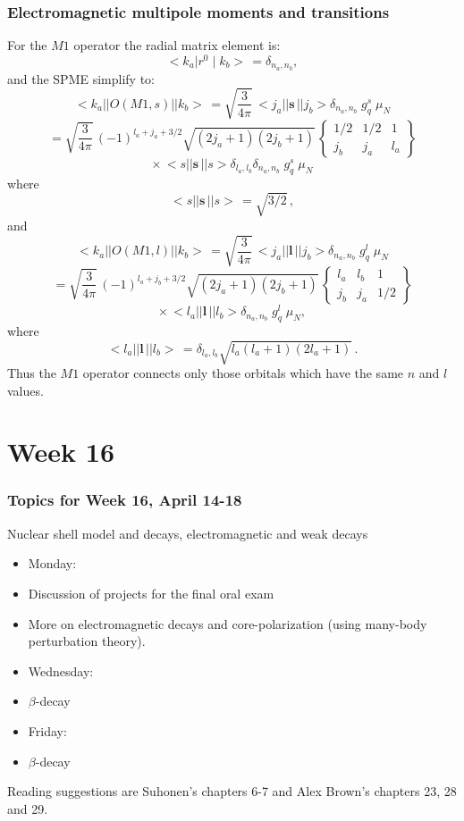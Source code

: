 \documentclass[compress]{beamer}
\renewcommand{\vec}[1]{\mathbf{#1}}
\renewcommand{\vec}[1]{\boldsymbol{#1}}
\begin{document}
\frame
{
\frametitle{Electromagnetic multipole moments and transitions}
\begin{small}
{\scriptsize
For the $  M1  $ operator the radial matrix element is:
$$
<k_{a}|r^{0}\mid k_{b}>\, = \delta _{n_{a},n_{b}},
$$
and the SPME simplify to:
$$
<k_{a}||O(M1,s)||k_{b}>\, =
\sqrt{ \frac{3}{4\pi }}\,
<j_{a}||\vec{s}\,||j_{b}>
\delta _{n_{a},n_{b}} \; g^{s}_{q} \; \mu _{N}
$$
$$
=
\sqrt{ \frac{3}{4\pi }}\,
(-1)^{l _{a}+j_{a}+3/2}
\sqrt{(2j_{a}+1)(2j_{b}+1)}\,
   \left\{\begin{array}{ccc}  {1/2}&  {1/2} & {1} \\ {j_{b}} & {j_{a}}&  {l _{a}}\end{array}\right\}
$$
$$
\times\,
<s||\vec{s}\,||s> \delta _{l _{a},l _{b}} \delta _{n_{a},n_{b}} \; g^{s}_{q} \; \mu _{N}$$
where
$$
<s||\vec{s}\,||s>\, = \sqrt{3/2}\, ,
$$
and
$$
<k_{a}||O(M1,l )||k_{b}>\, =
\sqrt{ \frac{3}{4\pi }}\,
<j_{a}||\vec{l}\,||j_{b}> \delta _{n_{a},n_{b}} \; g^{l }_{q} \; \mu _{N}
$$
$$
=
\sqrt{ \frac{3}{4\pi }}\,
(-1)^{l _{a}+j_{b}+3/2} \sqrt{(2j_{a}+1)(2j_{b}+1)}\,
   \left\{\begin{array}{ccc}  {l _{a}}&  {l _{b}} & {1}\\  {j_{b}}&  {j_{a}}&  {1/2}\end{array}\right\}
$$
$$
\times\,
<l _{a}||\vec{l}\,||l _{b}> \delta _{n_{a},n_{b}} \; g^{l }_{q} \; \mu _{N} ,       
$$
where
$$
<l _{a}||\vec{l}\,||l _{b}>\, = \delta _{l _{a},l _{b}} \sqrt{l _{a}(l 
_{a}+1)(2l _{a}+1)}\,.
$$
Thus the $  M1  $ operator connects only
those orbitals which have the same $  n  $ and $  l   $ values.

}
\end{small}
}

\section[Week 16]{Week 16}
\frame
{
  \frametitle{Topics for Week 16, April 14-18}
  \begin{block}{Nuclear shell model and decays, electromagnetic and weak decays}
\begin{itemize}
\item Monday:
\item Discussion of projects for the final oral exam
\item More on electromagnetic decays and core-polarization (using many-body perturbation theory).
\item Wednesday:
\item $\beta$-decay
\item Friday:
\item $\beta$-decay
\end{itemize}
Reading suggestions are Suhonen's chapters 6-7 and Alex Brown's chapters 23, 28 and 29. 
  \end{block}
} 
\end{document}
